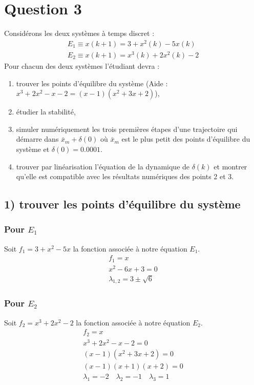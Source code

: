 \documentclass[11pt,a4paper]{report}
\begin{document}
	\section*{Question 3}
		Considérons les deux systèmes à temps discret :
			\begin{gather*}
				E_1 \equiv x(k+1) = 3 + x^2(k) -5x(k)\\
				E_2 \equiv x(k+1) = x^3(k) + 2x^2(k)-2
			\end{gather*}
		Pour chacun des deux systèmes l'étudiant devra :
		\begin{enumerate}
		
			\item trouver les points d'équilibre du système (Aide : $x^3 + 2x^2 - x - 2 = (x-1)(x^2+3x+2)$),
			\item étudier la stabilité,
			\item simuler numériquement les trois premières étapes d'une trajectoire qui démarre dans $\bar{x}_m + \delta(0)$ où $\bar{x}_m$ est le plus petit des points d'équilibre du système et $\delta(0) = 0.0001$.
			\item trouver par linéarisation l'équation de la dynamique de $\delta(k)$ et montrer qu'elle est compatible avec les résultats numériques des points 2 et 3.
		\end{enumerate}
		
		\subsection*{1) trouver les points d'équilibre du système}
			\subsubsection*{Pour $E_1$}
				Soit $f_1 = 3 + x^2 -5x$ la fonction associée à notre équation $E_1$.
				\begin{gather*}
					f_1 = x \\
					x^2 - 6x + 3 = 0 \\
					\lambda_{1,2} = 3 \pm \sqrt{6} 
				\end{gather*}
				
			\subsubsection*{Pour $E_2$}
				Soit $f_2 = x^3 + 2x^2 - 2$ la fonction associée à notre équation $E_2$.
				\begin{gather*}
					f_2 = x \\
					x^3 + 2x^2 - x - 2 = 0 \\
					(x-1)(x^2+3x+2) = 0 \\
					(x-1)(x+1)(x+2) = 0 \\
					\lambda_1 = -2 \quad \lambda_2 = -1 \quad \lambda_3 = 1
				\end{gather*}
				
\end{document}
